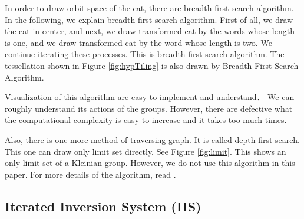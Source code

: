 In order to draw orbit space of the cat, there are breadth first search
algorithm.
In the following, we explain breadth first search algorithm.
First of all, we draw the cat in center, and
next, we draw transformed cat by the words whose length is one,
and we draw transformed cat by the word whose length is two.
We continue iterating these processes.
This is breadth first search algorithm.
The tessellation shown in Figure \ref{fig:hypTiling} is also drawn by
Breadth First Search Algorithm.

Visualization of this algorithm are easy to implement and understand．
We can roughly understand its actions of the groups.
However, there are defective what the computational complexity is  
easy to increase and it takes too much times.

Also, there is one more method of traversing graph.
It is called depth first search.
This one can draw only limit set directly.
See Figure \ref{fig:limit}. This shows an only limit set of a Kleinian
group.
However, we do not use this algorithm in this paper.
For more details of the algorithm, read \cite{MumfordSeriesWright200204}.

\subsection{Iterated Inversion System (IIS)}

